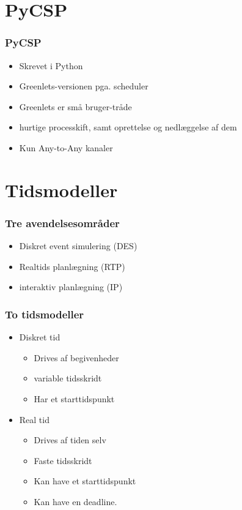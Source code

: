 \documentclass[12pt]{beamer}
\begin{document}
\section{PyCSP}
\begin{frame}		
  \frametitle{PyCSP}
  \begin{itemize}
  \item Skrevet i Python
	\item Greenlets-versionen pga. scheduler
	\item Greenlets er små bruger-tråde
	\item hurtige processkift, samt oprettelse og nedlæggelse af dem
	\item Kun Any-to-Any kanaler
  \end{itemize}
\end{frame}

\section{Tidsmodeller}
\begin{frame}
	\frametitle{Tre avendelsesområder}
	\begin{itemize}
		\item Diskret event simulering (DES)
		\item Realtids planlægning (RTP)
		\item interaktiv planlægning (IP)
	\end{itemize}
\end{frame}

\begin{frame}
	\frametitle{To tidsmodeller}
	\begin{itemize}
		\item Diskret tid
		\begin{itemize}
			\item Drives af begivenheder
			\item variable tidsskridt
			\item Har et starttidspunkt
 		\end{itemize}
		\item Real tid
		\begin{itemize}
			\item Drives af tiden selv
			\item Faste tidsskridt
			\item Kan have et starttidspunkt
			\item Kan have en deadline.
		\end{itemize}
	\end{itemize}
\end{frame}
\end{document}
